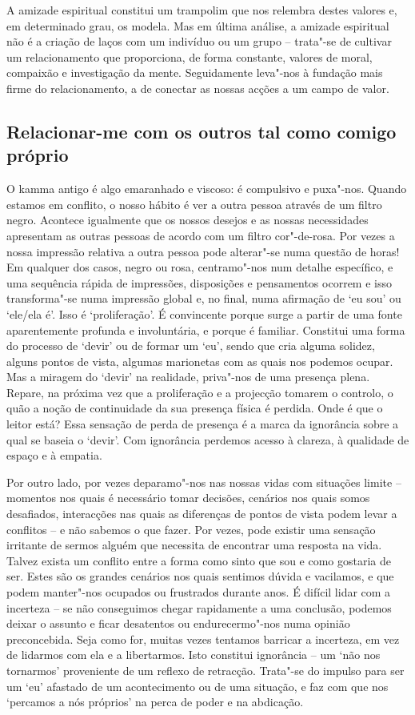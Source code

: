 A amizade espiritual constitui um trampolim que nos relembra destes valores e,
em determinado grau, os modela. Mas em última análise, a amizade espiritual não
é a criação de laços com um indivíduo ou um grupo -- trata"-se de cultivar um
relacionamento que proporciona, de forma constante, valores de moral, compaixão
e investigação da mente. Seguidamente leva"-nos à fundação mais firme do
relacionamento, a de conectar as nossas acções a um campo de valor.

\subsection{Relacionar-me com os outros tal como comigo próprio}

O kamma antigo é algo emaranhado e viscoso: é compulsivo e puxa"-nos. Quando
estamos em conflito, o nosso hábito é ver a outra pessoa através de um filtro
negro. Acontece igualmente que os nossos desejos e as nossas necessidades
apresentam as outras pessoas de acordo com um filtro cor"-de-rosa. Por vezes a
nossa impressão relativa a outra pessoa pode alterar"-se numa questão de horas!
Em qualquer dos casos, negro ou rosa, centramo"-nos num detalhe específico, e
uma sequência rápida de impressões, disposições e pensamentos ocorrem e isso
transforma"-se numa impressão global e, no final, numa afirmação de `eu sou' ou
`ele/ela é'. Isso é `proliferação'. É convincente porque surge a partir de uma
fonte aparentemente profunda e involuntária, e porque é familiar. Constitui uma
forma do processo de `devir' ou de formar um `eu', sendo que cria alguma
solidez, alguns pontos de vista, algumas marionetas com as quais nos podemos
ocupar. Mas a miragem do `devir' na realidade, priva"-nos de uma presença plena.
Repare, na próxima vez que a proliferação e a projecção tomarem o controlo, o
quão a noção de continuidade da sua presença física é perdida. Onde é que o
leitor está? Essa sensação de perda de presença é a marca da ignorância sobre a
qual se baseia o `devir'. Com ignorância perdemos acesso à clareza, à qualidade
de espaço e à empatia.

Por outro lado, por vezes deparamo"-nos nas nossas vidas com situações limite --
momentos nos quais é necessário tomar decisões, cenários nos quais somos
desafiados, interacções nas quais as diferenças de pontos de vista podem levar a
conflitos -- e não sabemos o que fazer. Por vezes, pode existir uma sensação
irritante de sermos alguém que necessita de encontrar uma resposta na vida.
Talvez exista um conflito entre a forma como sinto que sou e como gostaria de
ser. Estes são os grandes cenários nos quais sentimos dúvida e vacilamos, e que
podem manter"-nos ocupados ou frustrados durante anos. É difícil lidar com a
incerteza -- se não conseguimos chegar rapidamente a uma conclusão, podemos
deixar o assunto e ficar desatentos ou endurecermo"-nos numa opinião
preconcebida. Seja como for, muitas vezes tentamos barricar a incerteza, em vez
de lidarmos com ela e a libertarmos. Isto constitui ignorância -- um `não nos
tornarmos' proveniente de um reflexo de retracção. Trata"-se do impulso para ser
um `eu' afastado de um acontecimento ou de uma situação, e faz com que nos
`percamos a nós próprios' na perca de poder e na abdicação. 

